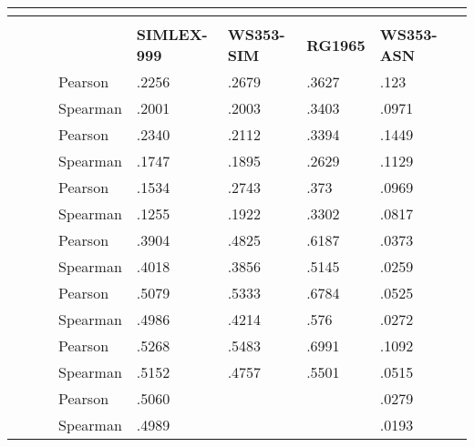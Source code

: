 \begin{table}
 \centering
 \begin{ThreePartTable} 
\begin{tabularx}{\textwidth}{p{3cm} *{2}{p{.5cm}} *{2}{p{1.7cm}} *{4}{L}} 
 \\
 \toprule
  &  &  &   &  &  \\
 & & & & \small{\textbf{SIMLEX-999}} & \small{\textbf{WS353-SIM}} & \small{\textbf{RG1965}} & \small{\textbf{WS353-ASN}} \\
 \toprule
  &  &  & Pearson & .2256 & .2679 & .3627 & .123 \\
 & & & Spearman & .2001 & .2003 & .3403 & .0971 \\
 
  &  &  & Pearson & .2340 & .2112 & .3394 & .1449 \\
 & & & Spearman & .1747 & .1895 & .2629 & .1129 \\
  
  &  &  & Pearson & .1534 & .2743 & .373 & .0969 \\
 & & & Spearman & .1255 & .1922 & .3302 & .0817 \\
  
  &  &  & Pearson & .3904 & .4825 & .6187 & .0373 \\
 & & & Spearman & .4018 & .3856 & .5145 & .0259 \\
  
  &  &  & Pearson & .5079 & .5333 & .6784 & .0525 \\
 & & & Spearman & .4986 & .4214 & .576 & .0272 \\
  
  &  &  & Pearson & .5268 & .5483 & .6991 & .1092 \\
 & & & Spearman & .5152 & .4757 & .5501 & .0515 \\
  &   &  & Pearson & .5060 & & & .0279 \\
 & & & Spearman & .4989 & & & .0193 \\


\end{tabularx}
\end{ThreePartTable}
\end{table}
